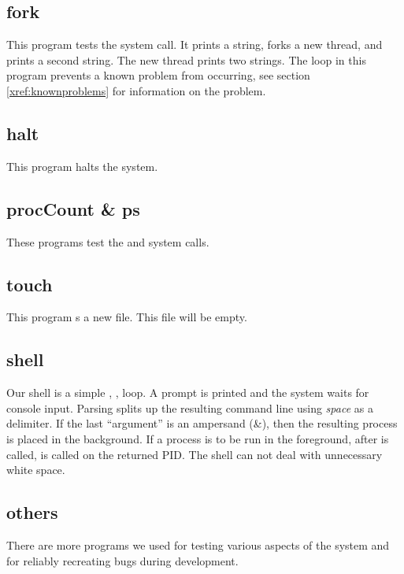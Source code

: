     \subsection{fork}
      This program tests the  system call. It prints a string, forks a new
      thread, and prints a second string. The new thread prints two strings. The
       loop in this program prevents a known problem from occurring, see
      section \ref{xref:knownproblems} for information on the  problem.
    
    \subsection{halt}
      This program halts the system.
    
    \subsection{procCount \& ps}
      These programs test the  and  system calls.
    
    \subsection{touch}
      This program s a new file. This file will be empty.
    
    \subsection{shell}
      Our shell is a simple , ,  loop. A prompt is
      printed and the system waits for console input. Parsing splits up the resulting
      command line using \emph{space} as a delimiter. If the last ``argument'' is an
      ampersand (\&), then the resulting process is placed in the background. If a
      process is to be run in the foreground, after  is called, 
      is called on the returned PID. The shell can not deal with unnecessary white space.

    \subsection{others}
      There are more programs we used for testing various aspects of the system and for
      reliably recreating bugs during development.
